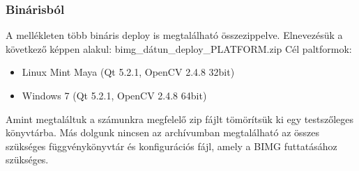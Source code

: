 \documentclass[a4paper,12pt,oneside]{report}
\begin{document}
\subsubsection{Binárisból}
A mellékleten több bináris deploy is megtalálható összezippelve. Elnevezésük a következő képpen alakul: bimg\_dátun\_deploy\_PLATFORM.zip
Cél paltformok:
\begin{itemize}
	\itemsep0em
	\item Linux Mint Maya (Qt 5.2.1, OpenCV 2.4.8 32bit)
	\item Windows 7 (Qt 5.2.1, OpenCV 2.4.8 64bit)
\end{itemize}
Amint megtaláltuk a számunkra megfelelő zip fájlt tömörítsük ki egy testszőleges könyvtárba. Más dolgunk nincsen az archívumban megtalálható az összes szükséges függvénykönyvtár és konfigurációs fájl, amely a BIMG futtatásához szükséges.
\end{document}
